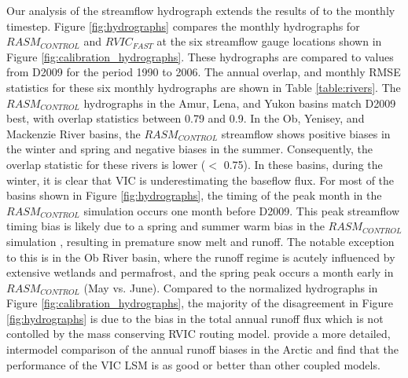 \documentclass[jgrga, draft]{agutex}
\begin{document}
\begin{article}
\begin{itemize}[leftmargin=+.5in]
\begin{itemize}[leftmargin=+.5in]
Our analysis of the streamflow hydrograph extends the results of \citet{Hamman_2016} to the monthly timestep.
Figure \ref{fig:hydrographs} compares the monthly hydrographs for $RASM_{CONTROL}$ and $RVIC_{FAST}$ at the six streamflow gauge locations shown in Figure \ref{fig:calibration_hydrographs}.
These hydrographs are compared to values from D2009 for the period 1990 to 2006.
The annual overlap, and monthly RMSE statistics for these six monthly hydrographs are shown in Table \ref{table:rivers}. %
The $RASM_{CONTROL}$ hydrographs in the Amur, Lena, and Yukon basins match D2009 best, with overlap statistics between 0.79 and 0.9.
In the Ob, Yenisey, and Mackenzie River basins, the $RASM_{CONTROL}$ streamflow shows positive biases in the winter and spring and negative biases in the summer.
Consequently, the overlap statistic for these rivers is lower ($<$ 0.75).
In these basins, during the winter, it is clear that VIC is underestimating the baseflow flux.
For most of the basins shown in Figure \ref{fig:hydrographs}, the timing of the peak month in the $RASM_{CONTROL}$ simulation occurs one month before D2009.
This peak streamflow timing bias is likely due to a spring and summer warm bias in the $RASM_{CONTROL}$ simulation \citep{Hamman_2016,Cassano_2016}, resulting in premature snow melt and runoff.
The notable exception to this is in the Ob River basin, where the runoff regime is acutely influenced by extensive wetlands and permafrost, and the spring peak occurs a month early in $RASM_{CONTROL}$ (May vs. June).
Compared to the normalized hydrographs in Figure \ref{fig:calibration_hydrographs}, the majority of the disagreement in Figure \ref{fig:hydrographs} is due to the bias in the total annual runoff flux which is not contolled by the mass conserving RVIC routing model.
\citet{Hamman_2016} provide a more detailed, intermodel comparison of the annual runoff biases in the Arctic and find that the performance of the VIC LSM is as good or better than other coupled models.


\end{itemize}
\end{itemize}
\end{article}
\end{document}
